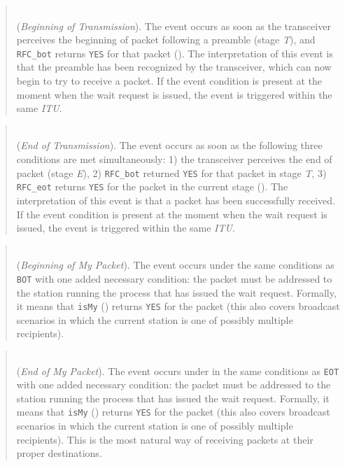 \begin{quote}
\noindent{}\\ \hspace{0in}
({\em Beginning of Transmission\/}).
The event occurs as soon as the transceiver perceives the beginning of packet
following a preamble (stage {\em T\/}),
and {\tt RFC\_bot} returns {\tt YES} for that packet
().
The interpretation of this event is that the preamble has been recognized
by the transceiver, which can now begin to try to receive a packet.
If the event condition is present at the moment when the wait request is
issued, the event is triggered within the same {\em ITU}.
\end{quote}

\begin{quote}
\noindent{}\\ \hspace{0in}
({\em End of Transmission\/}).
The event occurs as soon as the following three conditions are met
simultaneously: 1) the transceiver perceives the end of packet
(stage {\em E\/}), 2) {\tt RFC\_bot} returned {\tt YES} for that packet
in stage {\em T}, 3)
{\tt RFC\_eot} returns {\tt YES} for the packet in the
current stage ().
The interpretation of this event is that a packet has been successfully
received.
If the event condition is present at the moment when the wait request is
issued, the event is triggered within the same {\em ITU}.
\end{quote}

\begin{quote}
\noindent{}\\ \hspace{0in}
({\em Beginning of My Packet\/}).
The event occurs under the same conditions as {\tt BOT} with one added necessary
condition: the packet must be addressed to the station running the process
that has issued the wait request.
Formally, it means that {\tt isMy} () returns {\tt YES}
for the packet (this also covers broadcast scenarios in which the current
station is one of possibly multiple recipients).
\end{quote}

\begin{quote}
\noindent{}\\ \hspace{0in}
({\em End of My Packet\/}).
The event occurs under
in the same conditions as {\tt EOT} with one added necessary
condition: the packet must be addressed to the station running the process
that has issued the wait request.
Formally, it means that {\tt isMy} () returns {\tt YES}
for the packet (this also covers broadcast scenarios in which the current
station is one of possibly multiple recipients).
This is the most natural way of receiving packets at their proper
destinations.
\end{quote}

